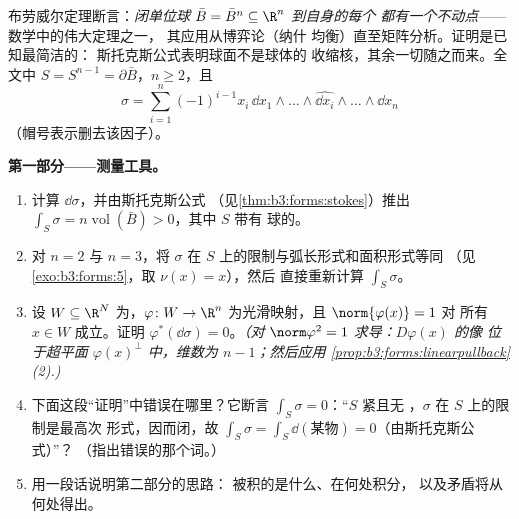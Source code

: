 \begin{problem}\label{pb:b3:forms:1}
布劳威尔定理断言：\emph{闭单位球
$\bar B = \bar B^n \subseteq \R^n$ 到自身的每个
都有一个不动点}——数学中的伟大定理之一，
其应用从博弈论（纳什
均衡）直至矩阵分析。证明是已知最简洁的：
斯托克斯公式表明球面不是球体的
收缩核，其余一切随之而来。全文中
$S = S^{n-1} = \partial\bar B$，$n \geq 2$，且
\[
\sigma = \sum_{i=1}^n(-1)^{i-1}x_i\,
\dd x_1\wedge\dots\wedge\widehat{\dd x_i}\wedge\dots\wedge
\dd x_n
\]
（帽号表示删去该因子）。

\medskip
\noindent\textbf{第一部分——测量工具。}
\begin{enumerate}
  \item 计算 $\dd\sigma$，并由斯托克斯公式
        （见\cref{thm:b3:forms:stokes}）推出 $\int_S\sigma =
        n\operatorname{vol}(\bar B) > 0$，其中 $S$ 带有
        球的。
  \item 对 $n = 2$ 与 $n = 3$，将
        $\sigma$ 在 $S$ 上的限制与弧长形式和面积形式等同
        （见\cref{exo:b3:forms:5}，取 $\nu(x) = x$），然后
        直接重新计算 $\int_S\sigma$。
  \item 设 $W \subseteq \R^N$ 为，$\varphi\colon W
        \to \R^n$ 为光滑映射，且 $\norm{\varphi(x)} = 1$ 对
        所有 $x \in W$ 成立。证明
        $\varphi^*(\dd\sigma) = 0$。\emph{（对
        $\norm\varphi^2 = 1$ 求导：$D\varphi(x)$ 的像
        位于超平面 $\varphi(x)^\perp$ 中，维数为
        $n - 1$；然后应用
        \cref{prop:b3:forms:linearpullback}(2).)}
  \item 下面这段“证明”中错误在哪里？它断言
        $\int_S\sigma = 0$：“$S$ 紧且无
        ，$\sigma$ 在 $S$ 上的限制是最高次
        形式，因而闭，故 $\int_S\sigma =
        \int_S\dd(\text{某物}) = 0$（由斯托克斯公式）”？
        （指出错误的那个词。）
  \item 用一段话说明第二部分的思路：
        被积的是什么、在何处积分，
        以及矛盾将从何处得出。
\end{enumerate}


\end{problem}
